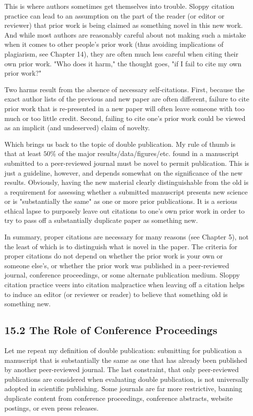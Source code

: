 This is where authors sometimes get themselves into trouble. Sloppy citation practice can lead to an assumption on the part of the reader (or editor or reviewer) that prior work is being claimed as something novel in this new work. And while most authors are reasonably careful about not making such a mistake when it comes to other people's prior work (thus avoiding implications of plagiarism, see Chapter 14), they are often much less careful when citing their own prior work. "Who does it harm," the thought goes, "if I fail to cite my own prior work?"

Two harms result from the absence of necessary self-citations. First, because the exact author lists of the previous and new paper are often different, failure to cite prior work that is re-presented in a new paper will often leave someone with too much or too little credit. Second, failing to cite one's prior work could be viewed as an implicit (and undeserved) claim of novelty.

Which brings us back to the topic of double publication. My rule of thumb is that at least $50 \%$ of the major results/data/figures/etc. found in a manuscript submitted to a peer-reviewed journal must be novel to permit publication. This is just a guideline, however, and depends somewhat on the significance of the new results. Obviously, having the new material clearly distinguishable from the old is a requirement for assessing whether a submitted manuscript presents new science or is "substantially the same" as one or more prior publications. It is a serious ethical lapse to purposely leave out citations to one's own prior work in order to try to pass off a substantially duplicate paper as something new.

In summary, proper citations are necessary for many reasons (see Chapter 5), not the least of which is to distinguish what is novel in the paper. The criteria for proper citations do not depend on whether the prior work is your own or someone else's, or whether the prior work was published in a peer-reviewed journal, conference proceedings, or some alternate publication medium. Sloppy citation practice veers into citation malpractice when leaving off a citation helps to induce an editor (or reviewer or reader) to believe that something old is something new.

\subsection*{15.2 The Role of Conference Proceedings}
Let me repeat my definition of double publication: submitting for publication a manuscript that is substantially the same as one that has already been published by another peer-reviewed journal. The last constraint, that only peer-reviewed publications are considered when evaluating double publication, is not universally adopted in scientific publishing. Some journals are far more restrictive, banning duplicate content from conference proceedings, conference abstracts, website postings, or even press releases.

